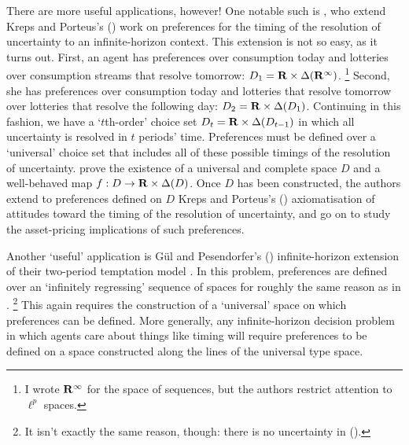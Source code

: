 \documentclass[11pt,letterpaper,reqno,oneside]{article}
\begin{document}
There are more useful applications, however! One notable such is \textcite{EpsteinZin1989}, who extend Kreps and Porteus's (\citeyear{KrepsPorteus1978}) work on preferences for the timing of the resolution of uncertainty to an infinite-horizon context. This extension is not so easy, as it turns out. First, an agent has preferences over consumption today and lotteries over consumption streams that resolve tomorrow: $D_1 = \mathbf{R} \times \Delta( \mathbf{R}^\infty )$.%
	\footnote{I wrote $\mathbf{R}^\infty$ for the space of sequences, but the authors restrict attention to $\ell^p$ spaces.}
Second, she has preferences over consumption today and lotteries that resolve tomorrow over lotteries that resolve the following day: $D_2 = \mathbf{R} \times \Delta( D_1 )$. Continuing in this fashion, we have a `$t$th-order' choice set $D_t = \mathbf{R} \times \Delta( D_{t-1} )$ in which all uncertainty is resolved in $t$ periods' time. Preferences must be defined over a `universal' choice set that includes all of these possible timings of the resolution of uncertainty. \textcite{EpsteinZin1989} prove the existence of a universal and complete space $D$ and a well-behaved map $f : D \to \mathbf{R} \times \Delta(D)$. Once $D$ has been constructed, the authors extend to preferences defined on $D$ Kreps and Porteus's (\citeyear{KrepsPorteus1978}) axiomatisation of attitudes toward the timing of the resolution of uncertainty, and go on to study the asset-pricing implications of such preferences.



Another `useful' application is Gül and Pesendorfer's (\citeyear{GulPesendorfer2016}) infinite-horizon extension of their two-period temptation model \parencite{GulPesendorfer2001}. In this problem, preferences are defined over an `infinitely regressing' sequence of spaces for roughly the same reason as in \textcite{EpsteinZin1989}.%
	\footnote{It isn't exactly the same reason, though: there is no uncertainty in (\citeyear{GulPesendorfer2016}).}
This again requires the construction of a `universal' space on which preferences can be defined. More generally, any infinite-horizon decision problem in which agents care about things like timing will require preferences to be defined on a space constructed along the lines of the universal type space.
\end{document}
